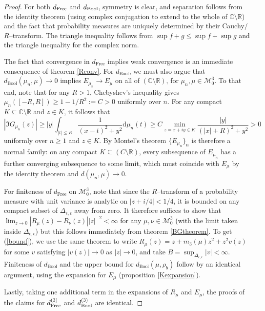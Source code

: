 \documentclass{amsart}
\theoremstyle{definition}
\theoremstyle{remark}
\newtheorem{remark}[theorem]{Remark}
\numberwithin{equation}{section}
\begin{document}
\begin{proof} 
    For both $d_{\text{\normalfont Free}}$ and $d_{\text{\normalfont Bool}}$, symmetry is clear, and separation follows from the identity theorem (using complex conjugation to extend to the whole of $\mathbb{C}\setminus \mathbb{R}$) and the fact that probability measures are uniquely determined by their Cauchy/$R$--transform. The triangle inequality follows from $\sup f+g \leq \sup f + \sup g$ and the triangle inequality for the complex norm.

    The fact that convergence in $d_{\text{Free}}$ implies weak convergence is an immediate consequence of theorem \ref{Rconv}. For $d_{\text{Bool}}$, we must also argue that $d_{\text{Bool}}(\mu_n,\mu)\to 0$ implies $E_{\mu_n}\to E_\mu$ on all of $(\mathbb{C}\setminus \mathbb{R})$, for $\mu_n,\mu\in \mathcal{M}_0^3$. To that end, note that for any $R>1$, Chebyshev's inequality gives $\mu_n([-R,R])\geq 1-1/R^2:=C>0$ uniformly over $n$. For any compact $K\subseteq \mathbb{C}\setminus \mathbb{R}$ and $z\in K$, it follows that
    \[
        |\Im G_{\mu_n}(z)|\geq |y|\int_{|t|\leq R} \frac{1}{(x-t)^2+y^2}\mathrm{d}\mu_{n}(t)\geq C \min_{z=x+iy\in K} \frac{|y|}{(|x|+R)^2+y^2} >0
    \]
     uniformly over $n\geq 1$ and $z\in K$. By Montel's theorem $\{E_{\mu_n}\}_n$ is therefore a normal family: on any compact $K\subseteq (C\setminus \mathbb{R})$, every subsequence of $E_{\mu_n}$ has a further converging subsequence to some limit, which must coincide with $E_{\mu}$ by the identity theorem and $d(\mu_n,\mu)\to 0$.

    
    For finiteness of $d_{\text{Free}}$ on $\mathcal{M}_0^3$, note that since the $R$--transform of a probability measure with unit variance is analytic on $|z+i/4|<1/4$, it is bounded on any compact subset of $\Delta_{\epsilon,\epsilon}$ away from zero. It therefore suffices to show that $\lim_{z\to 0} {|R_\mu(z)-R_\nu(z)|}{|z|^{-2}}<\infty$
    for any $\mu,\nu\in\mathcal{M}_0^3$ (with the limit taken inside $\Delta_{\epsilon,\epsilon}$) but this follows immediately from theorem \ref{BGtheorem}. 
    To get (\ref{bound}), we use the same theorem to write $R_\mu(z)=z+m_3(\mu)z^2+z^2v(z)$ for some $v$ satisfying $|v(z)|\to 0$ as $|z|\to 0$, and take $B=\sup_{\Delta_{\epsilon,\epsilon}}|v|<\infty$. Finiteness of $d_{\text{Bool}}$ and the upper bound for $d_{\text{Bool}}(\mu,\rho_b)$ follow by an identical argument, using the expansion for $E_\mu$ (proposition \ref{Kexpansion}).
    
    Lastly, taking one additional term in the expansions of $R_\mu$ and $E_\mu$, the proofs of the claims for $d^{(3)}_{\text{\normalfont{Free}}}$ and $d^{(3)}_{\text{\normalfont{Bool}}}$ are identical.
\end{proof}
\end{document}
